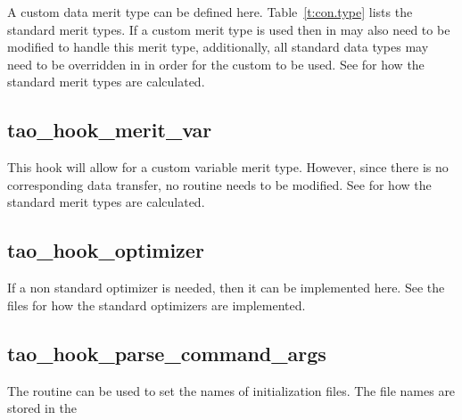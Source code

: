 {A custom data merit type can be defined here. Table~\ref{t:con.type} lists the standard merit
types. If a custom merit type is used then  in  may also
need to be modified to handle this merit type, additionally, all standard data types may need to be
overridden in  in order for the custom  to be used.  See
 for how the standard merit types are calculated.

\subsection{tao_hook_merit_var}

This hook will allow for a custom variable merit type. However, since there is no corresponding data
transfer, no  routine needs to be modified.  See  for how the standard
merit types are calculated.

\subsection{tao_hook_optimizer}

If a non standard optimizer is needed, then it can be implemented here. See the
 files for how the standard optimizers are implemented.

\subsection{tao_hook_parse_command_args}

The  routine can be used to set the names of initialization
files. The file names are stored in the \vn{s%
following changes the default plot initialization file:
\begin{example}
  s%
\end{example}
Note that if an initialization file name is given on the command line or in the root \tao
initialization file, that name will supersede the hook name.

}}
